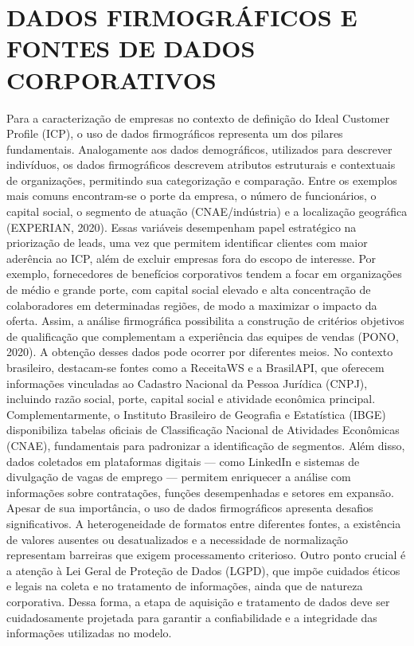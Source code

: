 \section{DADOS FIRMOGRÁFICOS E FONTES DE DADOS CORPORATIVOS}

Para a caracterização de empresas no contexto de definição do Ideal Customer Profile (ICP), o uso de dados firmográficos representa um dos pilares fundamentais. Analogamente aos dados demográficos, utilizados para descrever indivíduos, os dados firmográficos descrevem atributos estruturais e contextuais de organizações, permitindo sua categorização e comparação. Entre os exemplos mais comuns encontram-se o porte da empresa, o número de funcionários, o capital social, o segmento de atuação (CNAE/indústria) e a localização geográfica (EXPERIAN, 2020).
Essas variáveis desempenham papel estratégico na priorização de leads, uma vez que permitem identificar clientes com maior aderência ao ICP, além de excluir empresas fora do escopo de interesse. Por exemplo, fornecedores de benefícios corporativos tendem a focar em organizações de médio e grande porte, com capital social elevado e alta concentração de colaboradores em determinadas regiões, de modo a maximizar o impacto da oferta. Assim, a análise firmográfica possibilita a construção de critérios objetivos de qualificação que complementam a experiência das equipes de vendas (PONO, 2020).
A obtenção desses dados pode ocorrer por diferentes meios. No contexto brasileiro, destacam-se fontes como a ReceitaWS e a BrasilAPI, que oferecem informações vinculadas ao Cadastro Nacional da Pessoa Jurídica (CNPJ), incluindo razão social, porte, capital social e atividade econômica principal. Complementarmente, o Instituto Brasileiro de Geografia e Estatística (IBGE) disponibiliza tabelas oficiais de Classificação Nacional de Atividades Econômicas (CNAE), fundamentais para padronizar a identificação de segmentos. Além disso, dados coletados em plataformas digitais — como LinkedIn e sistemas de divulgação de vagas de emprego — permitem enriquecer a análise com informações sobre contratações, funções desempenhadas e setores em expansão.
Apesar de sua importância, o uso de dados firmográficos apresenta desafios significativos. A heterogeneidade de formatos entre diferentes fontes, a existência de valores ausentes ou desatualizados e a necessidade de normalização representam barreiras que exigem processamento criterioso. Outro ponto crucial é a atenção à Lei Geral de Proteção de Dados (LGPD), que impõe cuidados éticos e legais na coleta e no tratamento de informações, ainda que de natureza corporativa. Dessa forma, a etapa de aquisição e tratamento de dados deve ser cuidadosamente projetada para garantir a confiabilidade e a integridade das informações utilizadas no modelo.

